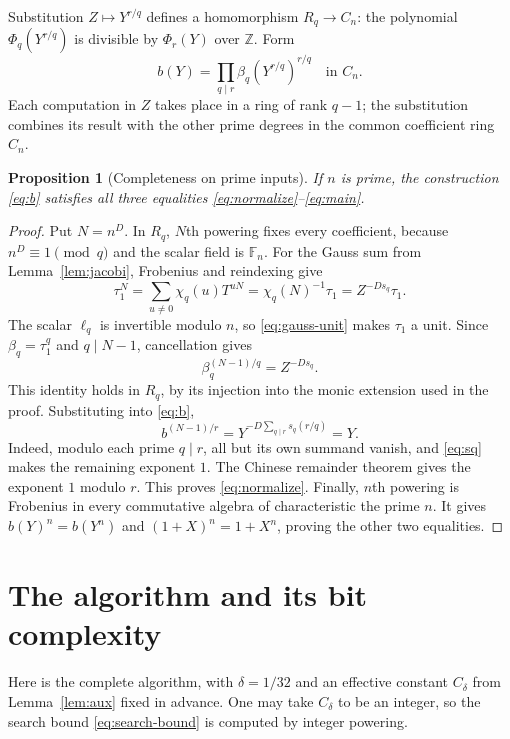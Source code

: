\documentclass[11pt]{article}
\newtheorem{proposition}[theorem]{Proposition}
\theoremstyle{definition}
\theoremstyle{remark}
\newcommand{\Z}{\mathbb Z}
\newcommand{\F}{\mathbb F}
\begin{document}
Substitution $Z\mapsto Y^{r/q}$ defines a homomorphism
$R_q\to C_n$: the polynomial $\Phi_q(Y^{r/q})$ is divisible by
$\Phi_r(Y)$ over $\Z$. Form
\begin{equation}\label{eq:b}
 b(Y)=\prod_{q\mid r}\beta_q(Y^{r/q})^{r/q}
        \quad\text{in }C_n.
\end{equation}
Each computation in $Z$ takes place in a ring of rank $q-1$;
the substitution combines its result with the other prime degrees
in the common coefficient ring $C_n$.

\begin{proposition}[Completeness on prime inputs]\label{prop:complete}
If $n$ is prime, the construction \eqref{eq:b} satisfies all
three equalities \eqref{eq:normalize}--\eqref{eq:main}.
\end{proposition}

\begin{proof}
Put $N=n^D$. In $R_q$, $N$th powering fixes every coefficient,
because $n^D\equiv1\pmod q$ and the scalar field is $\F_n$.
For the Gauss sum from Lemma~\ref{lem:jacobi}, Frobenius and
reindexing give
\[
 \tau_1^N=\sum_{u\ne0}\chi_q(u)T^{uN}
          =\chi_q(N)^{-1}\tau_1
          =Z^{-Ds_q}\tau_1.
\]
The scalar $\ell_q$ is invertible modulo $n$, so
\eqref{eq:gauss-unit} makes $\tau_1$ a unit. Since
$\beta_q=\tau_1^q$ and $q\mid N-1$, cancellation gives
\begin{equation}\label{eq:local-normalization}
 \beta_q^{(N-1)/q}=Z^{-Ds_q}.
\end{equation}
This identity holds in $R_q$, by its injection into the monic
extension used in the proof. Substituting into \eqref{eq:b},
\[
 b^{(N-1)/r}=Y^{-D\sum_{q\mid r}s_q(r/q)}=Y.
\]
Indeed, modulo each prime $q\mid r$, all but its own summand
vanish, and \eqref{eq:sq} makes the remaining exponent $1$.
The Chinese remainder theorem gives the exponent $1$ modulo $r$.
This proves \eqref{eq:normalize}. Finally, $n$th powering is
Frobenius in every commutative algebra of characteristic the prime
$n$. It gives $b(Y)^n=b(Y^n)$ and
$(1+X)^n=1+X^n$, proving the other two equalities.
\end{proof}

\section{The algorithm and its bit complexity}\label{sec:algorithm}

Here is the complete algorithm, with $\delta=1/32$ and an effective
constant $C_\delta$ from Lemma~\ref{lem:aux} fixed in advance.
One may take $C_\delta$ to be an integer, so the search bound
\eqref{eq:search-bound} is computed by integer powering.
\end{document}
